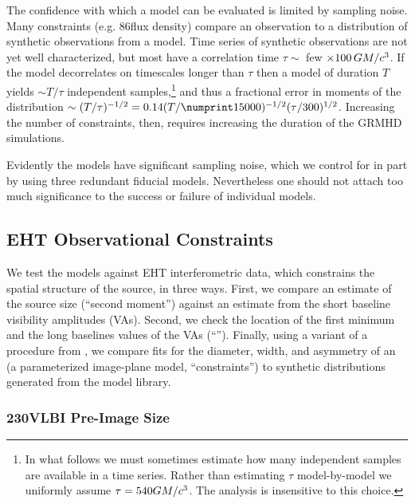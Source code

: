 The confidence with which a model can be evaluated is limited by sampling noise.
Many constraints (e.g. 86\GHz flux density) compare an observation to a distribution of synthetic observations from a model.
Time series of synthetic observations are not yet well characterized, but most have a correlation time $\tau\sim$ few $\times 100\,GM/c^3$.
If the model decorrelates on timescales longer than $\tau$ then a model of duration $T$ yields $\sim T/\tau$ independent samples,\footnote{In what follows we must sometimes estimate how many independent samples are available in a time series.
Rather than estimating $\tau$  model-by-model we uniformly assume $\tau = 540 GM/c^3$.
The analysis is insensitive to this choice.} and thus a fractional error in moments of the distribution $\sim (T/\tau)^{-1/2} = 0.14 (T/\no{15000})^{-1/2}(\tau/300)^{1/2}$.
Increasing the number of constraints, then, requires increasing the duration of the GRMHD simulations.

Evidently the models have significant sampling noise, which we control for in part by using three redundant fiducial models.
Nevertheless one should not attach too much significance to the success or failure of individual models.

\subsection{EHT Observational Constraints}

We test the models against EHT interferometric data, which constrains
the spatial structure of the source, in three ways.
First, we compare an estimate of the source size (``second moment'')
against an estimate from the short baseline visibility amplitudes
(VAs).
Second, we check the location of the first minimum and the long
baselines values of the VAs (``\vam'').
Finally, using a variant of a procedure from , we
compare fits for the diameter, width, and asymmetry of an \mring (a
parameterized image-plane model, ``\mring constraints'') to synthetic
distributions generated from the model library.

\subsubsection{230\GHz VLBI Pre-Image Size}
\label{sec:sz}

